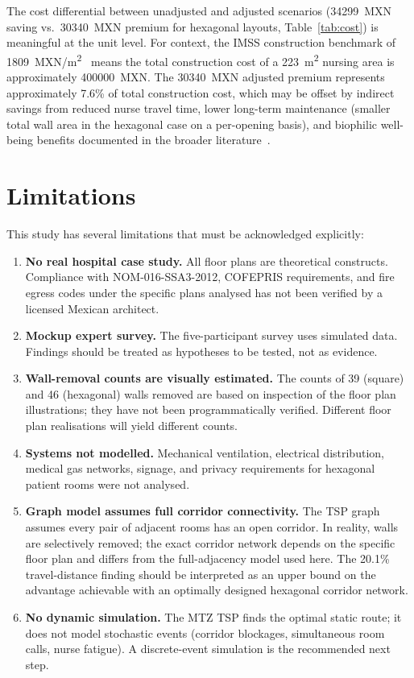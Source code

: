 \documentclass[12pt,a4paper]{article}
\begin{document}
The cost differential between unadjusted and adjusted scenarios
(\SI{34299}{MXN} saving vs.\ \SI{30340}{MXN} premium for hexagonal layouts,
Table~\ref{tab:cost}) is meaningful at the unit level.
For context, the IMSS construction benchmark of \SI{1809}{MXN/m\squared}~\cite{imss2022cost}
means the total construction cost of a \SI{223}{\metre\squared} nursing area is
approximately \SI{400000}{MXN}.
The \SI{30340}{MXN} adjusted premium represents approximately 7.6\% of total
construction cost, which may be offset by indirect savings from reduced nurse
travel time, lower long-term maintenance (smaller total wall area in the hexagonal
case on a per-opening basis), and biophilic well-being benefits documented in
the broader literature~\cite{khatib2024biophilic,yin2019biophilic}.

\section{Limitations}
\label{sec:limitations}

This study has several limitations that must be acknowledged explicitly:

\begin{enumerate}[noitemsep]
  \item \textbf{No real hospital case study.}
    All floor plans are theoretical constructs.
    Compliance with NOM-016-SSA3-2012, COFEPRIS requirements, and fire egress
    codes under the specific plans analysed has not been verified by a licensed
    Mexican architect.
  \item \textbf{Mockup expert survey.}
    The five-participant survey uses simulated data.
    Findings should be treated as hypotheses to be tested, not as evidence.
  \item \textbf{Wall-removal counts are visually estimated.}
    The counts of 39 (square) and 46 (hexagonal) walls removed are based on
    inspection of the floor plan illustrations; they have not been programmatically
    verified.
    Different floor plan realisations will yield different counts.
  \item \textbf{Systems not modelled.}
    Mechanical ventilation, electrical distribution, medical gas networks,
    signage, and privacy requirements for hexagonal patient rooms were not
    analysed.
  \item \textbf{Graph model assumes full corridor connectivity.}
    The TSP graph assumes every pair of adjacent rooms has an open corridor.
    In reality, walls are selectively removed; the exact corridor network
    depends on the specific floor plan and differs from the full-adjacency model
    used here.
    The 20.1\% travel-distance finding should be interpreted as an upper bound on
    the advantage achievable with an optimally designed hexagonal corridor network.
  \item \textbf{No dynamic simulation.}
    The MTZ TSP finds the optimal static route; it does not model stochastic
    events (corridor blockages, simultaneous room calls, nurse fatigue).
    A discrete-event simulation is the recommended next step.
\end{enumerate}
\end{document}
